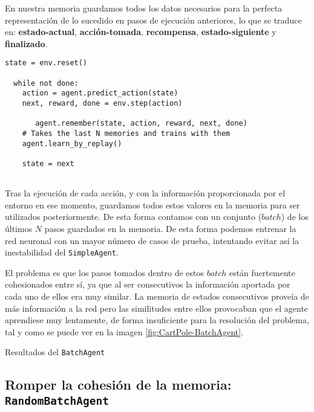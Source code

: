 En nuestra memoria guardamos todos los datos necesarios para la perfecta representación de lo sucedido en pasos de ejecución anteriores, lo que se traduce en: \textbf{estado-actual}, \textbf{acción-tomada}, \textbf{recompensa}, \textbf{estado-siguiente} y \textbf{finalizado}.

\begin{minipage}{0.9\linewidth}%
\begin{lstlisting}[frame=tb, caption=Pseudocódigo BatchAgent, inputencoding=latin1, label=code:cartpole_drl2]
  state = env.reset()

  while not done:
    action = agent.predict_action(state)
    next, reward, done = env.step(action)

       agent.remember(state, action, reward, next, done)
    # Takes the last N memories and trains with them
    agent.learn_by_replay()

    state = next
              
\end{lstlisting}%
\end{minipage}

Tras la ejecución de cada acción, y con la información proporcionada por el entorno en ese momento, guardamos todos estos valores en la memoria para ser utilizados posteriormente. De esta forma contamos con un conjunto ($batch$) de los últimos $N$ pasos guardados en la memoria. De esta forma podemos entrenar la red neuronal con un mayor número de casos de prueba, intentando evitar así la inestabilidad del \texttt{SimpleAgent}.

El problema es que los pasos tomados dentro de estos $batch$ están fuertemente cohesionados entre sí, ya que al ser consecutivos la información aportada por cada uno de ellos era muy similar. La memoria de estados consecutivos proveía de más información a la red pero las similitudes entre ellos provocaban que el agente aprendiese muy lentamente, de forma insuficiente para la resolución del problema, tal y como se puede ver en la imagen \ref{fig:CartPole-BatchAgent}.

%
       {Resultados del \texttt{BatchAgent}}


\subsection{Romper la cohesión de la memoria: \texttt{RandomBatchAgent}}
\label{sec:cartpoledqn3}

